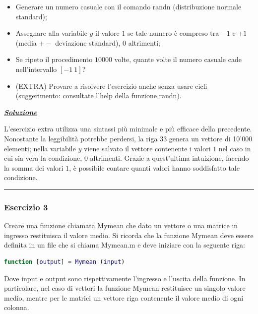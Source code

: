 \documentclass[a4paper]{article}
\newcommand{\longline}{\noindent\rule{\textwidth}{0.4pt}}
\begin{document}
	\begin{itemize}
		\item Generare un numero casuale con il comando \textsf{randn} (distribuzione normale standard);
		
		\item Assegnare alla variabile $y$ il valore $1$ se tale numero è compreso tra $-1$ e $+1$ (media $+-$ deviazione standard), $0$ altrimenti;
		
		\item Se ripeto il procedimento $10000$ volte, quante volte il numero casuale cade nell'intervallo $\left[-1 \: 1\right]$?
		
		\item (EXTRA) Provare a risolvere l'esercizio anche senza usare cicli (suggerimento: consultate l'help della funzione \textsf{randn}).
	\end{itemize}
	
	\noindent
	\textcolor{Green4}{\textbf{\underline{\emph{Soluzione}}}}\newline
	
	\noindent
	
	L'esercizio extra utilizza una sintassi più minimale e più efficace della precedente. Nonostante la leggibilità potrebbe perdersi, la riga 33 genera un vettore di 10'000 elementi; nella variabile $y$ viene salvato il vettore contenente i valori $1$ nel caso in cui sia vera la condizione, $0$ altrimenti. Grazie a quest'ultima intuizione, facendo la somma dei valori $1$, è possibile contare quanti valori hanno soddisfatto tale condizione.
	
	\longline
	
	\subsubsection{Esercizio 3}
	
	Creare una funzione chiamata \textsf{Mymean} che dato un vettore o una matrice in ingresso restituisca il valore medio. Si ricorda che la funzione \textsf{Mymean} deve essere definita in un file che si chiama \textsf{Mymean.m} e deve iniziare con la seguente riga:
	\begin{lstlisting}[language=MATLAB]
function [output] = Mymean (input)\end{lstlisting}
	Dove \textsf{input} e \textsf{output} sono rispettivamente l'ingresso e l'uscita della funzione. In particolare, nel caso di vettori la funzione \textsf{Mymean} restituisce un singolo valore medio, mentre per le matrici un vettore riga contenente il valore medio di ogni colonna.
	
\end{document}
